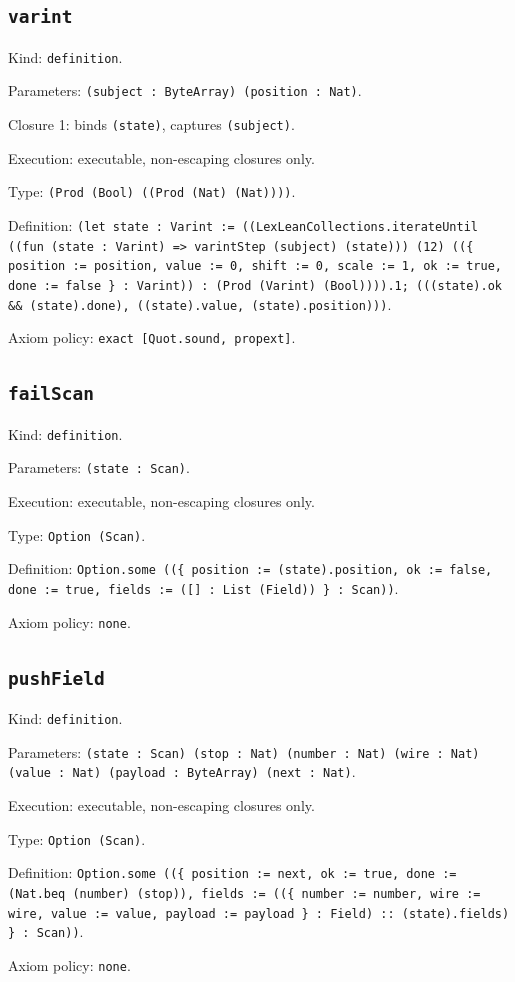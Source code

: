 \documentclass[11pt]{article}
\begin{document}
\subsection*{\texttt{varint}}
\noindent Kind: \texttt{definition}.\par
\noindent Parameters: \texttt{(subject : ByteArray) (position : Nat)}.\par
\noindent Closure 1: binds \texttt{(state)}, captures \texttt{(subject)}.\par
\noindent Execution: executable, non-escaping closures only.\par
\noindent Type: \texttt{(Prod (Bool) ((Prod (Nat) (Nat))))}.\par
\noindent Definition: \texttt{(let state : Varint := ((LexLeanCollections.iterateUntil ((fun (state : Varint) => varintStep (subject) (state))) (12) ((\{ position := position, value := 0, shift := 0, scale := 1, ok := true, done := false \} : Varint)) : (Prod (Varint) (Bool)))).1; (((state).ok \&\& (state).done), ((state).value, (state).position)))}.\par
\noindent Axiom policy: \texttt{exact [Quot.sound, propext]}.\par
\subsection*{\texttt{failScan}}
\noindent Kind: \texttt{definition}.\par
\noindent Parameters: \texttt{(state : Scan)}.\par
\noindent Execution: executable, non-escaping closures only.\par
\noindent Type: \texttt{Option (Scan)}.\par
\noindent Definition: \texttt{Option.some ((\{ position := (state).position, ok := false, done := true, fields := ([] : List (Field)) \} : Scan))}.\par
\noindent Axiom policy: \texttt{none}.\par
\subsection*{\texttt{pushField}}
\noindent Kind: \texttt{definition}.\par
\noindent Parameters: \texttt{(state : Scan) (stop : Nat) (number : Nat) (wire : Nat) (value : Nat) (payload : ByteArray) (next : Nat)}.\par
\noindent Execution: executable, non-escaping closures only.\par
\noindent Type: \texttt{Option (Scan)}.\par
\noindent Definition: \texttt{Option.some ((\{ position := next, ok := true, done := (Nat.beq (number) (stop)), fields := ((\{ number := number, wire := wire, value := value, payload := payload \} : Field) :: (state).fields) \} : Scan))}.\par
\noindent Axiom policy: \texttt{none}.\par
\end{document}
